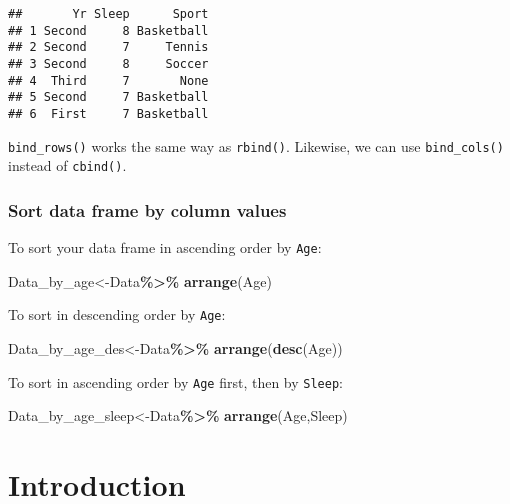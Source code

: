 \documentclass[
]{book}
\newenvironment{Shaded}{\begin{snugshade}}{\end{snugshade}}
\newcommand{\FunctionTok}[1]{\textcolor[rgb]{0.13,0.29,0.53}{\textbf{#1}}}
\newcommand{\NormalTok}[1]{#1}
\newcommand{\OtherTok}[1]{\textcolor[rgb]{0.56,0.35,0.01}{#1}}
\newcommand{\SpecialCharTok}[1]{\textcolor[rgb]{0.81,0.36,0.00}{\textbf{#1}}}
\begin{document}
\begin{verbatim}
##       Yr Sleep      Sport
## 1 Second     8 Basketball
## 2 Second     7     Tennis
## 3 Second     8     Soccer
## 4  Third     7       None
## 5 Second     7 Basketball
## 6  First     7 Basketball
\end{verbatim}

\texttt{bind\_rows()} works the same way as \texttt{rbind()}. Likewise, we can use \texttt{bind\_cols()} instead of \texttt{cbind()}.

\hypertarget{sort-data-frame-by-column-values-1}{%
\subsection{Sort data frame by column values}\label{sort-data-frame-by-column-values-1}}

To sort your data frame in ascending order by \texttt{Age}:

\begin{Shaded}
\begin{Highlighting}[]
\NormalTok{Data\_by\_age}\OtherTok{\textless{}{-}}\NormalTok{Data}\SpecialCharTok{\%\textgreater{}\%}
  \FunctionTok{arrange}\NormalTok{(Age)}
\end{Highlighting}
\end{Shaded}

To sort in descending order by \texttt{Age}:

\begin{Shaded}
\begin{Highlighting}[]
\NormalTok{Data\_by\_age\_des}\OtherTok{\textless{}{-}}\NormalTok{Data}\SpecialCharTok{\%\textgreater{}\%}
  \FunctionTok{arrange}\NormalTok{(}\FunctionTok{desc}\NormalTok{(Age))}
\end{Highlighting}
\end{Shaded}

To sort in ascending order by \texttt{Age} first, then by \texttt{Sleep}:

\begin{Shaded}
\begin{Highlighting}[]
\NormalTok{Data\_by\_age\_sleep}\OtherTok{\textless{}{-}}\NormalTok{Data}\SpecialCharTok{\%\textgreater{}\%}
  \FunctionTok{arrange}\NormalTok{(Age,Sleep)}
\end{Highlighting}
\end{Shaded}

\hypertarget{intro}{%
\chapter{Introduction}\label{intro}}
\end{document}

